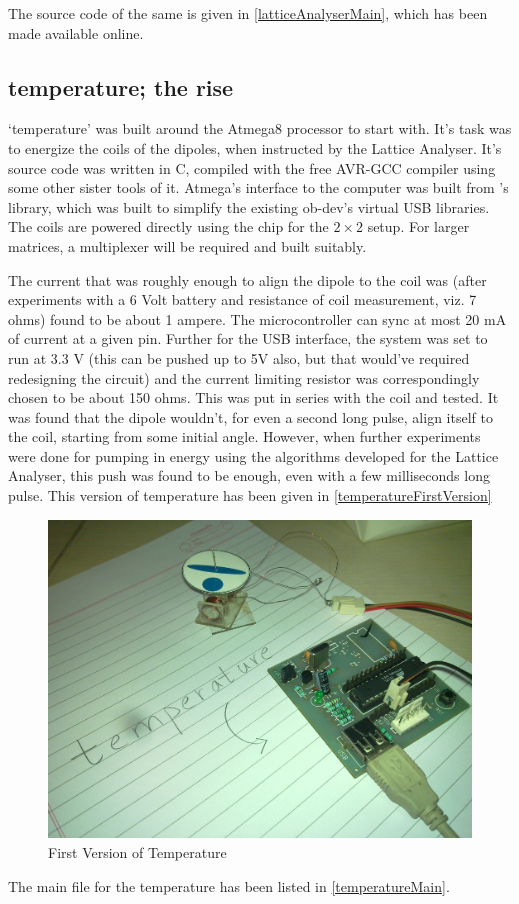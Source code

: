 		The source code of the same is given in \autoref{latticeAnalyserMain}, which has been made available online.
	\subsection{temperature; the rise}
		`temperature' was built around the Atmega8 processor to start with. It's task was to energize the coils of the dipoles, when instructed by the Lattice Analyser. It's source code was written in C, compiled with the free AVR-GCC compiler using some other sister tools of it. Atmega's interface to the computer was built from \myProf's library, which was built to simplify the existing ob-dev's virtual USB libraries. The coils are powered directly using the chip for the $2\times 2$ setup. For larger matrices, a multiplexer will be required and built suitably.
		\par
		The current that was roughly enough to align the dipole to the coil was (after experiments with a 6 Volt battery and resistance of coil measurement, viz. 7 ohms) found to be about 1 ampere. The microcontroller can sync at most 20 mA of current at a given pin. Further for the USB interface, the system was set to run at 3.3 V (this can be pushed up to 5V also, but that would've required redesigning the circuit) and the current limiting resistor was correspondingly chosen to be about 150 ohms. This was put in series with the coil and tested. It was found that the dipole wouldn't, for even a second long pulse, align itself to the coil, starting from some initial angle. However, when further experiments were done for pumping in energy using the algorithms developed for the Lattice Analyser, this push was found to be enough, even with a few milliseconds long pulse. This version of temperature has been given in \autoref{temperatureFirstVersion}
		\par
		\begin{figure}[bth]
			\begin{center}
				\includegraphics[width=0.85\linewidth]{gfx/temperature.jpg}
			\end{center}
		\caption[First Version of Temperature]{First Version of Temperature}
		\label{temperatureFirstVersion}
		\end{figure}
		\par
		The main file for the temperature has been listed in \autoref{temperatureMain}.

